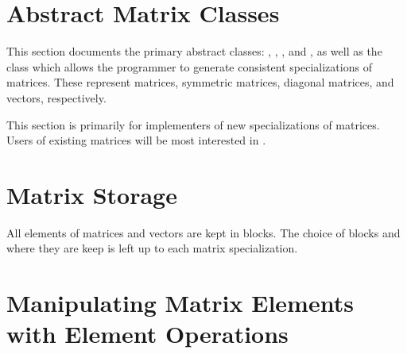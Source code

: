 





\section{Abstract Matrix Classes}

This section documents the primary abstract classes: ,
, , and ,
as well as the  class which allows the programmer to
generate consistent specializations of matrices.  These represent matrices,
symmetric matrices, diagonal matrices, and vectors, respectively.

This section is primarily for implementers of new specializations
of matrices.  Users of existing matrices will be most interested
in .







\section{Matrix Storage}

All elements of matrices and vectors are kept in blocks.  The
choice of blocks and where they are keep is left up to each
matrix specialization.











\section{Manipulating Matrix Elements with Element Operations}

